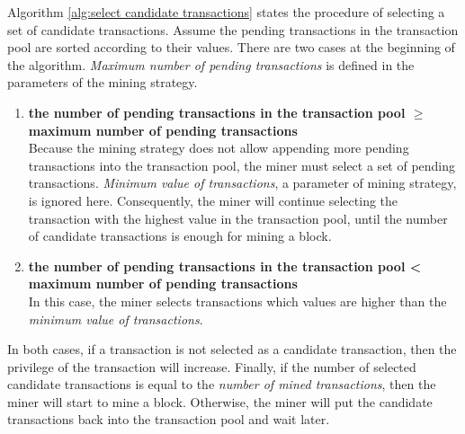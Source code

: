 Algorithm \ref{alg:select candidate transactions} states the procedure of selecting a set of candidate transactions. Assume the pending transactions in the transaction pool are sorted according to their values. There are two cases at the beginning of the algorithm. \textit{Maximum number of pending transactions} is defined in the parameters of the mining strategy.

\begin{enumerate}
    \item \textbf{the number of pending transactions in the transaction pool $\geq$ maximum number of pending transactions} \\
        Because the mining strategy does not allow appending more pending transactions into the transaction pool, the miner must select a set of pending transactions. \textit{Minimum value of transactions}, a parameter of mining strategy, is ignored here. Consequently, the miner will continue selecting the transaction with the highest value in the transaction pool, until the number of candidate transactions is enough for mining a block.
    \item \textbf{the number of pending transactions in the transaction pool < maximum number of pending transactions} \\
        In this case, the miner selects transactions which values are higher than the \textit{minimum value of transactions}.
\end{enumerate}

In both cases, if a transaction is not selected as a candidate transaction, then the privilege of the transaction will increase. Finally, if the number of selected candidate transactions is equal to the \textit{number of mined transactions}, then the miner will start to mine a block. Otherwise, the miner will put the candidate transactions back into the transaction pool and wait later.

